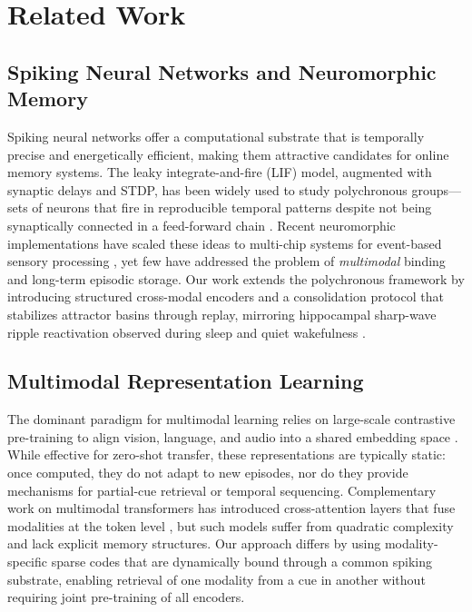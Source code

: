 \section{Related Work}

\subsection{Spiking Neural Networks and Neuromorphic Memory}

Spiking neural networks offer a computational substrate that is temporally precise and energetically efficient, making them attractive candidates for online memory systems. The leaky integrate-and-fire (LIF) model, augmented with synaptic delays and STDP, has been widely used to study polychronous groups---sets of neurons that fire in reproducible temporal patterns despite not being synaptically connected in a feed-forward chain \cite{izhikevich2006polychronization}. Recent neuromorphic implementations have scaled these ideas to multi-chip systems for event-based sensory processing \cite{davies2018loihi}, yet few have addressed the problem of \textit{multimodal} binding and long-term episodic storage. Our work extends the polychronous framework by introducing structured cross-modal encoders and a consolidation protocol that stabilizes attractor basins through replay, mirroring hippocampal sharp-wave ripple reactivation observed during sleep and quiet wakefulness \cite{girardeau2009selective}.

\subsection{Multimodal Representation Learning}

The dominant paradigm for multimodal learning relies on large-scale contrastive pre-training to align vision, language, and audio into a shared embedding space \cite{radford2021learning}. While effective for zero-shot transfer, these representations are typically static: once computed, they do not adapt to new episodes, nor do they provide mechanisms for partial-cue retrieval or temporal sequencing. Complementary work on multimodal transformers has introduced cross-attention layers that fuse modalities at the token level \cite{li2019visualbert}, but such models suffer from quadratic complexity and lack explicit memory structures. Our approach differs by using modality-specific sparse codes that are dynamically bound through a common spiking substrate, enabling retrieval of one modality from a cue in another without requiring joint pre-training of all encoders.

